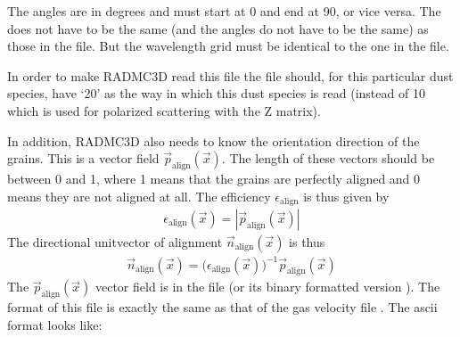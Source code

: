 \documentclass[letterpaper,10pt,english]{sphinxmanual}
\begin{document}
The angles  are in degrees and must start at 0 and end at 90, or vice
versa.  The  does not have to be the same (and the angles do not have to
be the same) as those in the  file. But the wavelength
grid must be identical to the one in the  file.

In order to make RADMC\sphinxhyphen{}3D read this file  the
 file should, for this particular dust species, have ‘20’ as the
way in which this dust species is read (instead of 10 which is used for
polarized scattering with the Z matrix).

In addition, RADMC\sphinxhyphen{}3D also needs to know the orientation direction of the
grains. This is a vector field \(\vec p_{\mathrm{align}}(\vec x)\). The
length of these vectors should be between 0 and 1, where 1 means that the grains
are perfectly aligned and 0 means they are not aligned at all. The efficiency
\(\epsilon_{\mathrm{align}}\) is thus given by
\begin{equation*}
\begin{split}\epsilon_{\mathrm{align}}(\vec x) =|\vec p_{\mathrm{align}}(\vec x)|\end{split}
\end{equation*}
The directional unit\sphinxhyphen{}vector of alignment \(\vec n_{\mathrm{align}}(\vec x)\)
is thus
\begin{equation*}
\begin{split}\vec n_{\mathrm{align}}(\vec x) = \big(\epsilon_{\mathrm{align}}(\vec x)\big)^{-1}\vec p_{\mathrm{align}}(\vec x)\end{split}
\end{equation*}
The \(\vec p_{\mathrm{align}}(\vec x)\) vector field is in
the file  (or its binary formatted version
). The format of this file is exactly the
same as that of the gas velocity file . The
ascii format looks like:

\begin{sphinxVerbatim}[commandchars=\\\{\}]
                                      
\PYG{p}{[}\PYG{p}{]}       \PYG{p}{[}\PYG{p}{]}       \PYG{p}{[}\PYG{p}{]}
\PYG{p}{[}\PYG{p}{]} \PYG{p}{[}\PYG{p}{]} \PYG{p}{[}\PYG{p}{]}
\end{sphinxVerbatim}
\end{document}
